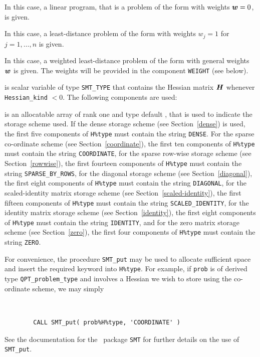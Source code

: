 \documentclass{galahad}
\newcommand{\packagename}{QPT}
\begin{document}
\begin{description}
\begin{description}
  In this case, a linear program, that is a problem of the form
 with weights ${\bm{w}} = 0$, is given.

 In this case, a least-distance problem of the form 
with weights $w_{j} = 1$ for $j = 1, \ldots , n$ is given.

 In this case, a weighted least-distance problem of the form 
with general weights ${\bm{w}}$ is given. The weights will be
provided in the component {\tt WEIGHT} (see below).

\end{description}

 is scalar variable of type {\tt SMT\_TYPE}
that contains the Hessian matrix ${\bm{H}}$ whenever {\tt Hessian\_kind} $<0$.
The following components are used:

\begin{description}

 is an allocatable array of rank one and type default \character, that
is used to indicate the storage scheme used. If the dense storage scheme
(see Section~\ref{dense}) is used,
the first five components of {\tt H\%type} must contain the
string {\tt DENSE}.
For the sparse co-ordinate scheme (see Section~\ref{coordinate}),
the first ten components of {\tt H\%type} must contain the
string {\tt COORDINATE},
for the sparse row-wise storage scheme (see Section~\ref{rowwise}),
the first fourteen components of {\tt H\%type} must contain the
string {\tt SPARSE\_BY\_ROWS},
for the diagonal storage scheme (see Section~\ref{diagonal}),
the first eight components of {\tt H\%type} must contain the
string {\tt DIAGONAL},
for the scaled-identity matrix storage scheme
(see Section~\ref{scaled-identity}),
the first fifteen components of {\tt H\%type} must contain the
string {\tt SCALED\_IDENTITY},
for the identity matrix storage scheme
(see Section~\ref{identity}),
the first eight components of {\tt H\%type} must contain the
string {\tt IDENTITY}, and
for the zero matrix storage scheme
(see Section~\ref{zero}),
the first four components of {\tt H\%type} must contain the
string {\tt ZERO}.

For convenience, the procedure {\tt SMT\_put}
may be used to allocate sufficient space and insert the required keyword
into {\tt H\%type}.
For example, if {\tt prob} is of derived type {\tt \packagename\_problem\_type}
and involves a Hessian we wish to store using the co-ordinate scheme,
we may simply
{\tt
\begin{verbatim}
        CALL SMT_put( prob%H%type, 'COORDINATE' )
\end{verbatim}
}
\noindent
See the documentation for the \galahad\ package {\tt SMT}
for further details on the use of {\tt SMT\_put}.


\end{description}
\end{description}
\end{document}
